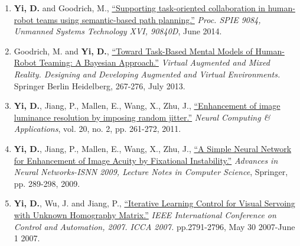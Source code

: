 \documentclass[10pt]{article}
\makeatletter
\newlength{\bibhang}
\newlength{\bibsep}
 {\@listi \global\bibsep\itemsep \global\advance\bibsep by\parsep}
\newenvironment{bibsection}%
        {\begin{enumerate}{}{%
       \setlength{\leftmargin}{\bibhang}%
       \setlength{\itemindent}{-\leftmargin}%
       \setlength{\itemsep}{\bibsep}%
       \setlength{\parsep}{\z@}%
        \setlength{\partopsep}{0pt}%
        \setlength{\topsep}{0pt}}}
        {\end{enumerate}\vspace{-.6\baselineskip}}
\renewcommand{\section}[1]{\pagebreak[3]%
    \hyphenpenalty=10000%
    \vspace{1.3\baselineskip}%
    \phantomsection\addcontentsline{toc}{section}{#1}%
    \noindent\llap{\scshape\smash{\parbox[t]{\marginparwidth}{\raggedright #1}}}%
    \vspace{-\baselineskip}\par}
\newenvironment{innerlist}[1][\enskip\textbullet]%
        {\begin{itemize}[#1,leftmargin=*,parsep=0pt,itemsep=0pt,topsep=0pt,partopsep=0pt]}
        {\end{itemize}}
\makeatother
\begin{document}
\begin{bibsection}
    \item {\bf Yi, D.} and Goodrich, M., \href{http://spie.org/Publications/Proceedings/Paper/10.1117/12.2050718}{``Supporting task-oriented collaboration in human-robot teams using semantic-based path planning.''} \emph{Proc. SPIE 9084, Unmanned Systems Technology XVI, 90840D}, June 2014.
    
    \item Goodrich, M. and {\bf Yi, D.}, \href{http://link.springer.com/chapter/10.1007\%2F978-3-642-39405-8_30}{``Toward Task-Based Mental Models of Human-Robot Teaming: A Bayesian Approach.''} \emph{Virtual Augmented and Mixed Reality. Designing and Developing Augmented and Virtual Environments.} Springer Berlin Heidelberg, 267-276, July 2013. 
    
    \item {\bf Yi, D.}, Jiang, P., Mallen, E., Wang, X., Zhu, J., \href{http://link.springer.com/article/10.1007\%2Fs00521-010-0433-1}{``Enhancement of image luminance resolution by imposing random jitter.''} \emph{Neural Computing \& Applications}, vol. 20, no. 2, pp. 261-272, 2011.
    
    \item {\bf Yi, D.}, Jiang, P., Mallen, E., Wang, X., Zhu, J., \href{http://link.springer.com/chapter/10.1007\%2F978-3-642-01513-7_31}{``A Simple Neural Network for Enhancement of Image Acuity by Fixational Instability.''} \emph{Advances in Neural Networks-ISNN 2009, Lecture Notes in Computer Science}, Springer, pp. 289-298, 2009.
    
    \item {\bf Yi, D.}, Wu, J. and Jiang, P., \href{http://ieeexplore.ieee.org/xpl/articleDetails.jsp?tp=&arnumber=4376870}{``Iterative Learning Control for Visual Servoing with Unknown Homography Matrix.''} \emph{IEEE International Conference on Control and Automation, 2007. ICCA 2007.} pp.2791-2796, May 30 2007-June 1 2007.
\end{bibsection}


\end{document}
